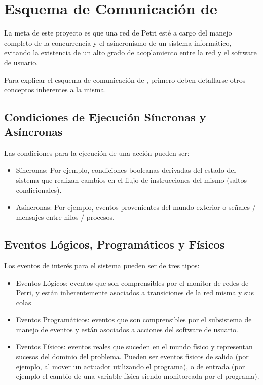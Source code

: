 \section{Esquema de Comunicación de \nombreFramework}
La meta de este proyecto es que una red de Petri esté a cargo del manejo
completo de la concurrencia y el asincronismo de un sistema informático,
evitando la existencia de un alto grado de acoplamiento entre la red y
el software de usuario.

Para explicar el esquema de comunicación de \nombreFramework , primero deben
detallarse otros conceptos inherentes a la misma.


\subsection{Condiciones de Ejecución Síncronas y Asíncronas}
Las condiciones para la ejecución de una acción pueden ser:
  \begin{itemize}
	\item Síncronas: Por ejemplo, condiciones booleanas derivadas del estado del
		sistema que realizan cambios en el flujo de instrucciones del mismo (saltos
		condicionales).
	\item Asíncronas: Por ejemplo, eventos provenientes del mundo exterior o
		señales / mensajes entre hilos / procesos.
  \end{itemize}
  
\subsection{Eventos Lógicos, Programáticos y Físicos}
Los eventos de interés para el sistema pueden ser de tres tipos:
  \begin{itemize}
    \item Eventos Lógicos: eventos que son comprensibles por el monitor de
    redes de Petri, y están inherentemente asociados a transiciones de la red
    misma y sus colas
    \item Eventos Programáticos: eventos que son comprensibles por el
    subsistema de manejo de eventos y están asociados a acciones del
    software de usuario.
    \item Eventos Físicos: eventos reales que suceden en el mundo físico y
    representan sucesos del dominio del problema. Pueden ser eventos fisicos de
    salida (por ejemplo, al mover un actuador utilizando el programa), o de
    entrada (por ejemplo el cambio de una variable física siendo monitoreada por
    el programa).
  \end{itemize}
  
